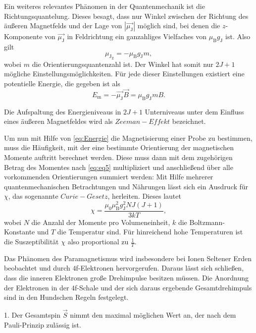 Ein weiteres relevantes Phänomen in der Quantenmechanik ist die Richtungsquantelung. Dieses besagt, dass nur Winkel zwischen der Richtung des äußeren Magnetfelds und der Lage von
$\left|\vec{\mu_\text{J}}\right|$ möglich sind, bei denen die $z$-Komponente von $\vec{\mu_\text{J}}$ in Feldrichtung ein ganzahliges Vielfaches von $\mu_\text{B}g_\text{J}$ ist.
Also gilt
\begin{equation}
\label{eq:eq5}
\mu_{\text{J}_\text{Z}} = - \mu_\text{B}g_\text{J}m,
\end{equation}
wobei $m$ die Orientierungsquantenzahl ist. Der Winkel hat somit nur $2J+1$ mögliche Einstellungsmöglichkeiten. Für jede dieser Einstellungen existiert eine potentielle Energie,
die gegeben ist als
\begin{equation*}
	\label{eq:Energie}
E_\text{m} = - \vec{\mu_\text{J}}\vec{B} = \mu_\text{B}g_\text{J}mB.
\end{equation*}

Die Aufspaltung des Energieniveaus in $2J+1$ Unterniveaus unter dem Einfluss eines äußeren Magnetfeldes wird als $\mathit{Zeeman-Effekt}$ bezeichnet.

Um nun mit Hilfe von \autoref{eq:Energie} die Magnetisierung einer Probe zu bestimmen, muss die Häufigkeit, mit der eine bestimmte Orientierung der magnetischen Momente auftritt berechnet
werden. Diese muss dann mit dem zugehörigen Betrag des Momentes nach \autoref{eq:eq5} multipliziert und anschließend über alle vorkommenden Orientierungen summiert werden:
Mit Hilfe mehrerer quantenmechanischen Betrachtungen und Nährungen lässt sich ein Ausdruck für $\chi$, das sogenannte $\mathit{Curie-Gesetz}$, herleiten.
Dieses lautet
\begin{equation}
\label{eq:mariecurie}
\chi = \frac{\mu_0\mu_\text{B}^{2}g_\text{J}^{2}NJ(J+1)}{3kT},
\end{equation}
wobei $N$ die Anzahl der Momente pro Volumeneinheit, $k$ die Boltzmann-Konstante und $T$ die Temperatur sind.
Für hinreichend hohe Temperaturen ist die Suszeptibilität $\chi$ also proportional zu $\frac{1}{T}$.

Das Phänomen des Paramagnetismus wird insbesondere bei Ionen Seltener Erden beobachtet und durch $4$f-Elektronen hervorgerufen. Daraus lässt sich schließen, dass die
inneren Elektronen große Drehimpulse besitzen müssen. Die Anordnung der Elektronen in der $4$f-Schale und der sich daraus ergebende Gesamtdrehimpuls sind in den Hundschen Regeln
festgelegt. 

1. Der Gesamtspin $\vec{S}$ nimmt den maximal möglichen Wert an, der nach dem Pauli-Prinzip zulässig ist. 

